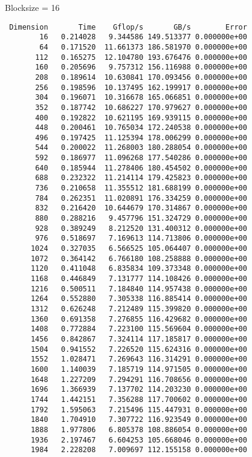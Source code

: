 \documentclass{article}
\begin{document}
\begin{enumerate}
    Blocksize = 16
    \begin{verbatim}
 Dimension       Time    Gflop/s       GB/s        Error
        16   0.214028   9.344586 149.513377 0.000000e+00
        64   0.171520  11.661373 186.581970 0.000000e+00
       112   0.165275  12.104780 193.676476 0.000000e+00
       160   0.205696   9.757312 156.116988 0.000000e+00
       208   0.189614  10.630841 170.093456 0.000000e+00
       256   0.198596  10.137495 162.199917 0.000000e+00
       304   0.196071  10.316678 165.066851 0.000000e+00
       352   0.187742  10.686227 170.979627 0.000000e+00
       400   0.192822  10.621195 169.939115 0.000000e+00
       448   0.200461  10.765034 172.240538 0.000000e+00
       496   0.197425  11.125394 178.006299 0.000000e+00
       544   0.200022  11.268003 180.288054 0.000000e+00
       592   0.186977  11.096268 177.540286 0.000000e+00
       640   0.185944  11.278406 180.454502 0.000000e+00
       688   0.232322  11.214114 179.425823 0.000000e+00
       736   0.210658  11.355512 181.688199 0.000000e+00
       784   0.262351  11.020891 176.334259 0.000000e+00
       832   0.216420  10.644679 170.314867 0.000000e+00
       880   0.288216   9.457796 151.324729 0.000000e+00
       928   0.389249   8.212520 131.400312 0.000000e+00
       976   0.518697   7.169613 114.713806 0.000000e+00
      1024   0.327035   6.566525 105.064407 0.000000e+00
      1072   0.364142   6.766180 108.258888 0.000000e+00
      1120   0.411048   6.835834 109.373348 0.000000e+00
      1168   0.446849   7.131777 114.108426 0.000000e+00
      1216   0.500511   7.184840 114.957438 0.000000e+00
      1264   0.552880   7.305338 116.885414 0.000000e+00
      1312   0.626248   7.212489 115.399820 0.000000e+00
      1360   0.691358   7.276855 116.429682 0.000000e+00
      1408   0.772884   7.223100 115.569604 0.000000e+00
      1456   0.842867   7.324114 117.185817 0.000000e+00
      1504   0.941552   7.226520 115.624316 0.000000e+00
      1552   1.028471   7.269643 116.314291 0.000000e+00
      1600   1.140039   7.185719 114.971505 0.000000e+00
      1648   1.227209   7.294291 116.708656 0.000000e+00
      1696   1.366939   7.137702 114.203230 0.000000e+00
      1744   1.442151   7.356288 117.700602 0.000000e+00
      1792   1.595063   7.215496 115.447931 0.000000e+00
      1840   1.704910   7.307722 116.923549 0.000000e+00
      1888   1.977806   6.805378 108.886054 0.000000e+00
      1936   2.197467   6.604253 105.668046 0.000000e+00
      1984   2.228208   7.009697 112.155158 0.000000e+00
    \end{verbatim}


\end{enumerate}
\end{document}

